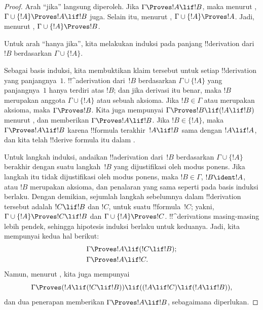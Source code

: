 \documentclass[../../../include/open-logic-section]{subfiles}
\begin{document}
\begin{proof}
Arah ``jika'' langsung diperoleh. Jika $\Gamma \Proves !A \lif !B$,
maka menurut , $\Gamma \cup \{!A\}
\Proves !A \lif !B$ juga. Selain itu, menurut
, $\Gamma \cup \{!A\} \Proves !A$. Jadi,
menurut , $\Gamma \cup \{!A\} \Proves !B$.

Untuk arah ``hanya jika'', kita melakukan induksi pada panjang
!!{derivation} dari $!B$ berdasarkan $\Gamma \cup \{!A\}$.

Sebagai basis induksi, kita membuktikan klaim tersebut untuk setiap
!!{derivation} yang panjangnya~$1$. !!^a{derivation} dari~$!B$
berdasarkan $\Gamma \cup \{!A\}$ yang panjangnya~$1$ hanya terdiri atas
$!B$; dan jika derivasi itu benar, maka $!B$ merupakan anggota
$\Gamma \cup \{!A\}$ atau sebuah aksioma. Jika $!B \in \Gamma$ atau
merupakan aksioma, maka $\Gamma \Proves !B$. Kita juga mempunyai
$\Gamma \Proves !B \lif (!A \lif !B)$ menurut
, dan  memberikan
$\Gamma \Proves !A \lif !B$. Jika $!B \in \{!A\}$, maka
$\Gamma \Proves !A \lif !B$ karena !!{formula} terakhir~$!A \lif !B$
sama dengan $!A \lif !A$, dan kita telah !!{derive} formula itu dalam
.

Untuk langkah induksi, andaikan !!a{derivation} dari~$!B$ berdasarkan
$\Gamma \cup \{!A\}$ berakhir dengan suatu langkah~$!B$ yang
dijustifikasi oleh modus ponens. Jika langkah itu tidak dijustifikasi
oleh modus ponens, maka
$!B \in \Gamma$, $!B \ident !A$, atau $!B$ merupakan aksioma, dan
penalaran yang sama seperti pada basis induksi berlaku.
Dengan demikian, sejumlah
langkah sebelumnya dalam
!!{derivation} tersebut adalah $!C \lif !B$ dan $!C$, untuk suatu
!!{formula}~$!C$;
yakni, $\Gamma \cup \{!A\} \Proves !C \lif !B$ dan
$\Gamma \cup \{!A\} \Proves !C$. !!^{derivation}s masing-masing lebih
pendek, sehingga hipotesis induksi berlaku untuk keduanya. Jadi, kita
mempunyai kedua hal berikut:
\begin{align*}
  & \Gamma \Proves !A \lif (!C \lif !B); \\
  & \Gamma \Proves !A \lif !C.
\end{align*}
Namun, menurut , kita juga mempunyai
\[
\Gamma \Proves (!A \lif (!C \lif !B)) \lif
((!A\lif !C)  \lif (!A \lif !B)),
\]
dan dua penerapan  memberikan
$\Gamma \Proves !A \lif !B$, sebagaimana diperlukan.
\end{proof}
\end{document}
